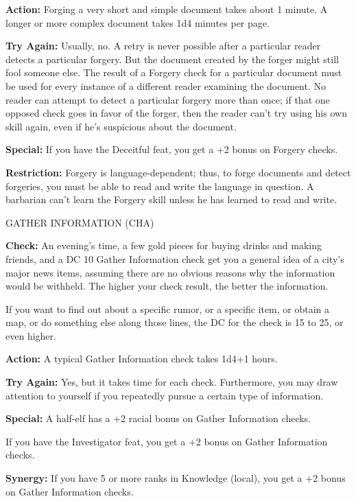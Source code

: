 \documentclass{article}
\begin{document}
\textbf{Action:} Forging a very short and simple document takes about 1 minute. 
A longer or more complex document takes 1d4 minutes per page.

\textbf{Try Again:} Usually, no. A retry is never possible after a particular reader 
detects a particular forgery. But the document created by the forger might still 
fool someone else. The result of a Forgery check for a particular document must 
be used for every instance of a different reader examining the document. No reader 
can attempt to detect a particular forgery more than once; if that one opposed 
check goes in favor of the forger, then the reader can't try using his own skill 
again, even if he's suspicious about the document.

\textbf{Special:} If you have the Deceitful feat, you get a +2 bonus on Forgery 
checks.

\textbf{Restriction:} Forgery is language-dependent; thus, to forge documents and 
detect forgeries, you must be able to read and write the language in question. 
A barbarian can't learn the Forgery skill unless he has learned to read and write.

\vspace{12pt}
GATHER INFORMATION (CHA)

\textbf{Check:} An evening's time, a few gold pieces for buying drinks and making 
friends, and a DC 10 Gather Information check get you a general idea of a city's 
major news items, assuming there are no obvious reasons why the information would 
be withheld. The higher your check result, the better the information.

If you want to find out about a specific rumor, or a specific item, or obtain a 
map, or do something else along those lines, the DC for the check is 15 to 25, 
or even higher.

\textbf{Action:} A typical Gather Information check takes 1d4+1 hours.

\textbf{Try Again:} Yes, but it takes time for each check. Furthermore, you may 
draw attention to yourself if you repeatedly pursue a certain type of information.

\textbf{Special:} A half-elf has a +2 racial bonus on Gather Information checks.

If you have the Investigator feat, you get a +2 bonus on Gather Information checks.

\textbf{Synergy:} If you have 5 or more ranks in Knowledge (local), you get a +2 
bonus on Gather Information checks.
\end{document}
